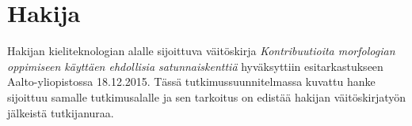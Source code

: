 \documentclass[12pt,a4paper,finnish,oneside]{article}
\begin{document}





\section{Hakija}

Hakijan kieliteknologian alalle sijoittuva väitöskirja \textit{Kontribuutioita morfologian oppimiseen käyttäen ehdollisia satunnaiskenttiä} hyväksyttiin esitarkastukseen Aalto-yliopistossa 18.12.2015. Tässä tutkimussuunnitelmassa kuvattu hanke sijoittuu samalle tutkimusalalle ja sen tarkoitus on edistää hakijan väitöskirjatyön jälkeistä tutkijanuraa. 



\end{document}
